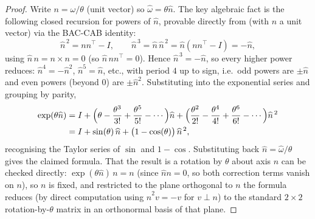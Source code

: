 \documentclass[11pt,a4paper]{report}
\theoremstyle{definition}
\theoremstyle{remark}
\begin{document}
\begin{proof}
Write $n=\omega/\theta$ (unit vector) so $\widehat\omega=\theta\widehat n$.
The key algebraic fact is the following closed recursion for powers of
$\widehat n$, provable directly from  (with $n$ a unit
vector) via the BAC-CAB identity:
\[
\widehat n^{\,2} = nn^\top - I,
\qquad
\widehat n^{\,3} = \widehat n\,\widehat n^{\,2} = \widehat n(nn^\top-I) = -\widehat n,
\]
using $\widehat n\,n=n\times n=0$ (so $\widehat n\,nn^\top=0$). Hence
$\widehat n^{\,3}=-\widehat n$, so every higher power reduces:
$\widehat n^{4}=-\widehat n^{2}$, $\widehat n^{5}=\widehat n$, etc., with
period $4$ up to sign, i.e.\ odd powers are $\pm\widehat n$ and even powers
(beyond $0$) are $\pm\widehat n^2$. Substituting into the exponential series
and grouping by parity,
\begin{align*}
\exp(\theta\widehat n)
&= I + \Bigl(\theta - \frac{\theta^3}{3!}+\frac{\theta^5}{5!}-\cdots\Bigr)\widehat n
+ \Bigl(\frac{\theta^2}{2!}-\frac{\theta^4}{4!}+\frac{\theta^6}{6!}-\cdots\Bigr)\widehat n^{\,2}\\
&= I + \sin(\theta)\,\widehat n + \bigl(1-\cos(\theta)\bigr)\,\widehat n^{\,2} ,
\end{align*}
recognising the Taylor series of $\sin$ and $1-\cos$. Substituting back
$\widehat n=\widehat\omega/\theta$ gives the claimed formula. That the
result is a rotation by $\theta$ about axis $n$ can be checked directly:
$\exp(\theta\widehat n)\,n = n$ (since $\widehat n n=0$, so both correction
terms vanish on $n$), so $n$ is fixed, and restricted to the plane
orthogonal to $n$ the formula reduces (by direct computation using
$\widehat n^2 v=-v$ for $v\perp n$) to the standard $2\times2$ rotation-by-$\theta$
matrix in an orthonormal basis of that plane.
\end{proof}
\end{document}
